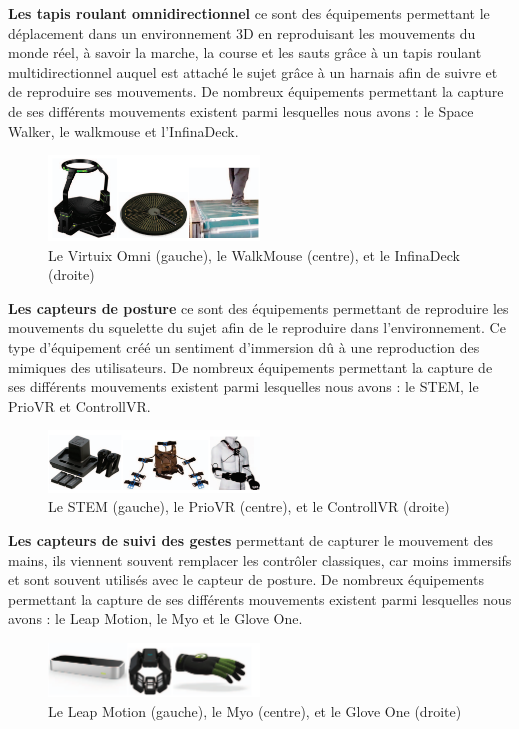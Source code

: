 \textbf{Les tapis roulant omnidirectionnel} ce sont des équipements permettant le déplacement dans un environnement 3D en reproduisant les mouvements du monde réel, à savoir la marche, la course et les sauts grâce à un tapis roulant multidirectionnel auquel est attaché le sujet grâce à un harnais afin de suivre et de reproduire ses mouvements.
De nombreux équipements permettant la capture de ses différents mouvements existent parmi lesquelles nous avons : le Space Walker, le walkmouse et l'InfinaDeck.

\begin{figure}[H]
	\centering
	\includegraphics[width=0.5\textwidth]{img/3dtap}
	\caption{Le Virtuix Omni (gauche), le WalkMouse (centre), et le InfinaDeck (droite)}
\end{figure}

\textbf{Les capteurs de posture} ce sont des équipements permettant de reproduire les mouvements du squelette du sujet afin de le reproduire dans l'environnement. Ce type d'équipement créé un sentiment d'immersion dû à une reproduction des mimiques des utilisateurs.
De nombreux équipements permettant la capture de ses différents mouvements existent parmi lesquelles nous avons : le STEM, le PrioVR et ControllVR.

\begin{figure}[H]
	\centering
	\includegraphics[width=0.5\textwidth]{img/3dcptt}
	\caption{Le STEM (gauche), le PrioVR (centre), et le ControllVR (droite)}
\end{figure}

\textbf{Les capteurs de suivi des gestes} permettant de capturer le mouvement des mains, ils viennent souvent remplacer les contrôler classiques, car moins immersifs et sont souvent utilisés avec le capteur de posture.
De nombreux équipements permettant la capture de ses différents mouvements existent parmi lesquelles nous avons : le Leap Motion, le Myo et le Glove One.

\begin{figure}[H]
	\centering
	\includegraphics[width=0.5\textwidth]{img/3dgan}
	\caption{Le Leap Motion (gauche), le Myo (centre), et le Glove One (droite)}
\end{figure}

